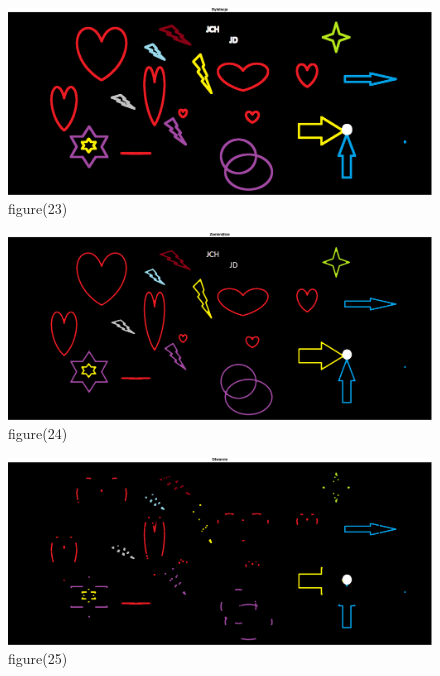\documentclass[10pt,a4paper,twoside]{article}%
\begin{document}
\begin{figure}[H]
    \centering
    \includegraphics[width=1\linewidth]{kod matlab/myVectorFile23.pdf}
\caption{figure(23)}
    \label{fig:obr1}
\end{figure}

\begin{figure}[H]
    \centering
    \includegraphics[width=1\linewidth]{kod matlab/myVectorFile24.pdf}
\caption{figure(24)}
    \label{fig:obr1}
\end{figure}

\begin{figure}[H]
    \centering
    \includegraphics[width=1\linewidth]{kod matlab/myVectorFile25.pdf}
\caption{figure(25)}
    \label{fig:obr1}
\end{figure}
\end{document}
